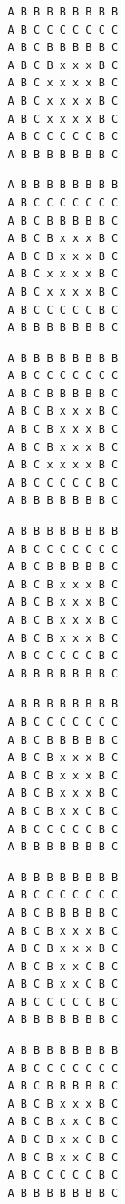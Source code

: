 { \begin{verbatim}
         A B B B B B B B B
         A B C C C C C C C
         A B C B B B B B C
         A B C B x x x B C
         A B C x x x x B C
         A B C x x x x B C
         A B C x x x x B C
         A B C C C C C B C
         A B B B B B B B C
\end{verbatim} }

{ \begin{verbatim}
         A B B B B B B B B
         A B C C C C C C C
         A B C B B B B B C
         A B C B x x x B C
         A B C B x x x B C
         A B C x x x x B C
         A B C x x x x B C
         A B C C C C C B C
         A B B B B B B B C
\end{verbatim} }

{ \begin{verbatim}
         A B B B B B B B B
         A B C C C C C C C
         A B C B B B B B C
         A B C B x x x B C
         A B C B x x x B C
         A B C B x x x B C
         A B C x x x x B C
         A B C C C C C B C
         A B B B B B B B C
\end{verbatim} }

{ \begin{verbatim}
         A B B B B B B B B
         A B C C C C C C C
         A B C B B B B B C
         A B C B x x x B C
         A B C B x x x B C
         A B C B x x x B C
         A B C B x x x B C
         A B C C C C C B C
         A B B B B B B B C
\end{verbatim} }

{ \begin{verbatim}
         A B B B B B B B B
         A B C C C C C C C
         A B C B B B B B C
         A B C B x x x B C
         A B C B x x x B C
         A B C B x x x B C
         A B C B x x C B C
         A B C C C C C B C
         A B B B B B B B C
\end{verbatim} }

{ \begin{verbatim}
         A B B B B B B B B
         A B C C C C C C C
         A B C B B B B B C
         A B C B x x x B C
         A B C B x x x B C
         A B C B x x C B C
         A B C B x x C B C
         A B C C C C C B C
         A B B B B B B B C
\end{verbatim} }

{ \begin{verbatim}
         A B B B B B B B B
         A B C C C C C C C
         A B C B B B B B C
         A B C B x x x B C
         A B C B x x C B C
         A B C B x x C B C
         A B C B x x C B C
         A B C C C C C B C
         A B B B B B B B C
\end{verbatim} }

